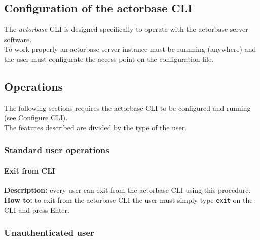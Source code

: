 \documentclass{scalatekids-article}
\begin{document}



\subsection{Configuration of the actorbase CLI}
\label{sec:configurationcli}
The \textit{actorbase} CLI is designed specifically to operate 
with the actorbase server software.\\
To work properly an actorbase server instance must be runnning 
(anywhere) and the user must configurate the access point on the configuration file.

\subsection{Operations}

The following sections requires the actorbase CLI to be configured and 
running (see \hyperref[sec:configurationcli]{Configure CLI}).\\
The features described are divided by the type of the user.

\subsubsection{Standard user operations}
\label{sec:everyuser}
\paragraph{Exit from CLI}

\textbf{Description:} every user can exit from the actorbase CLI 
using this procedure.\\
\textbf{How to:} to exit from the actorbase CLI the user must simply type \texttt{exit} on the CLI and 
press Enter.

\subsubsection{Unauthenticated user}
\label{sec:unauthenticateduser}
\end{document}
